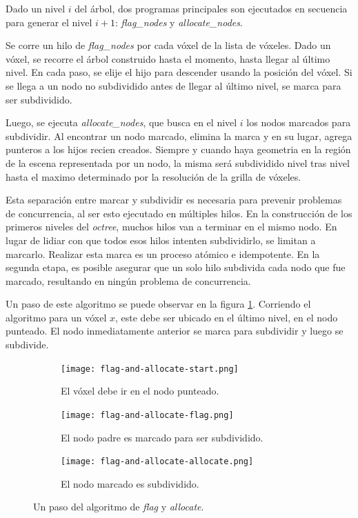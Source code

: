 Dado un nivel $i$ del árbol, dos programas principales son ejecutados en secuencia para generar el nivel $i + 1$: \textit{flag\_nodes} y \textit{allocate\_nodes}.

Se corre un hilo de \textit{flag\_nodes} por cada vóxel de la lista de vóxeles.
Dado un vóxel, se recorre el árbol construido hasta el momento, hasta llegar al último nivel.
En cada paso, se elije el hijo para descender usando la posición del vóxel.
Si se llega a un nodo no subdividido antes de llegar al último nivel, se marca para ser subdividido.

Luego, se ejecuta \textit{allocate\_nodes}, que busca en el nivel $i$ los nodos marcados para subdividir.
Al encontrar un nodo marcado, elimina la marca y en su lugar, agrega punteros a los hijos recien creados.
Siempre y cuando haya geometria en la región de la escena representada por un nodo, la misma será subdividido nivel tras nivel hasta el maximo determinado por la resolución de la grilla de vóxeles.

Esta separación entre marcar y subdividir es necesaria para prevenir problemas de concurrencia, al ser esto ejecutado en múltiples hilos.
En la construcción de los primeros niveles del \textit{octree}, muchos hilos van a terminar en el mismo nodo.
En lugar de lidiar con que todos esos hilos intenten subdividirlo, se limitan a marcarlo.
Realizar esta marca es un proceso atómico e idempotente.
En la segunda etapa, es posible asegurar que un solo hilo subdivida cada nodo que fue marcado, resultando en ningún problema de concurrencia.

Un paso de este algoritmo se puede observar en la figura \ref{fig:flag-and-allocate}.
Corriendo el algoritmo para un vóxel $x$, este debe ser ubicado en el último nivel, en el nodo punteado.
El nodo inmediatamente anterior se marca para subdividir y luego se subdivide.

\begin{figure}[ht]
    \begin{subfigure}{.32\textwidth}
        \centering
        \texttt{[image: flag-and-allocate-start.png]}
        \caption{El vóxel debe ir en el nodo punteado.}
    \end{subfigure}
    \begin{subfigure}{.32\textwidth}
        \centering
        \texttt{[image: flag-and-allocate-flag.png]}
        \caption{El nodo padre es marcado para ser subdividido.}
    \end{subfigure}
    \begin{subfigure}{.32\textwidth}
        \centering
        \texttt{[image: flag-and-allocate-allocate.png]}
        \caption{El nodo marcado es subdividido.}
    \end{subfigure}
    \caption{Un paso del algoritmo de \textit{flag} y \textit{allocate}.}
    \label{fig:flag-and-allocate}
\end{figure}


